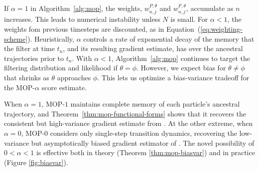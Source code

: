 \documentclass[9pt,twocolumn,pnasresearcharticle]{pnas-new}
\begin{document}




If $\alpha=1$ in Algorithm~\ref{alg:mop}, the weights, $w^{P,\theta}_{n,j}$ and $w^{F,\theta}_{n,j}$, accumulate as $n$ increases.
This leads to numerical instability unless $N$ is small.
For $\alpha<1$, the weights fom previous timesteps are discounted, as in Equation~(\ref{eq:weighting-scheme}).
Heuristically, $\alpha$ controls a rate of exponential decay of the memory that the filter at time $t_n$, and its resulting gradient estimate, has over the ancestral trajectories prior to $t_n$.
With $\alpha<1$, Algorithm~\ref{alg:mop} continues to target the filtering distribution and likelihood if $\theta=\phi$.
However, we expect bias for $\theta\neq\phi$ that shrinks as $\theta$ approaches $\phi$.
This lets us optimize a bias-variance tradeoff for the MOP-$\alpha$ score estimate.

When $\alpha=1$, MOP-$1$ maintains complete memory of each particle's ancestral trajectory, and Theorem~\ref{thm:mop-functional-forms} shows that it recovers the consistent but high-variance gradient estimate from \cite{poyiadjis11, scibior21}.
At the other extreme, when $\alpha=0$, MOP-$0$ considers only single-step transition dynamics, recovering the low-variance but asymptotically biased gradient estimator of \cite{naesseth18}. 
The novel possibility of $0<\alpha<1$ is effective both in theory (Theorem \ref{thm:mop-biasvar}) and in practice (Figure \ref{fig:biasvar}). 
\end{document}
